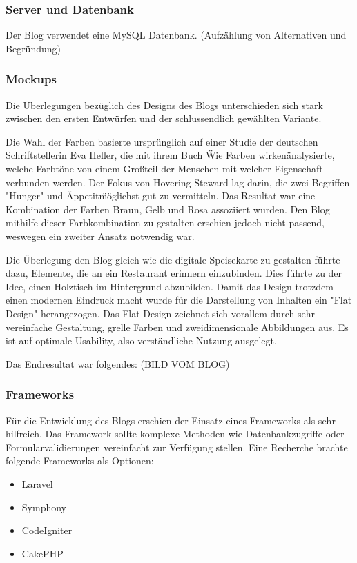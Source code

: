     \subsubsection{Server und Datenbank}
    Der Blog verwendet eine MySQL Datenbank. (Aufzählung von Alternativen und Begründung)
    \subsubsection{Mockups}
    Die Überlegungen bezüglich des Designs des Blogs unterschieden sich stark zwischen den ersten
    Entwürfen und der schlussendlich gewählten Variante.

    Die Wahl der Farben basierte ursprünglich auf einer Studie der deutschen Schriftstellerin Eva Heller,
    die mit ihrem Buch \"Wie Farben wirken\" analysierte, welche Farbtöne von einem Großteil der Menschen
    mit welcher Eigenschaft verbunden werden. Der Fokus von Hovering Steward lag darin, die zwei Begriffen {"Hunger"\cite{WieFarbenWirken}}
    und \"Appetit\" möglichst gut zu vermitteln. Das Resultat war eine Kombination der Farben Braun, Gelb und Rosa
    assoziiert wurden. Den Blog mithilfe dieser Farbkombination zu gestalten erschien jedoch nicht passend, weswegen
    ein zweiter Ansatz notwendig war.

    Die Überlegung den Blog gleich wie die digitale Speisekarte zu gestalten führte dazu, Elemente, die an ein Restaurant
    erinnern einzubinden. Dies führte zu der Idee, einen Holztisch im Hintergrund abzubilden.
    Damit das Design trotzdem einen modernen Eindruck macht wurde für die Darstellung von Inhalten ein {"Flat Design"\cite{FlatDesign}}
    herangezogen. Das Flat Design zeichnet sich vorallem durch sehr vereinfache Gestaltung, grelle Farben und zweidimensionale Abbildungen aus.
    Es ist auf optimale Usability, also verständliche Nutzung ausgelegt.

    Das Endresultat war folgendes:
    (BILD VOM BLOG)
    \subsubsection{Frameworks}
    Für die Entwicklung des Blogs erschien der Einsatz eines Frameworks als sehr hilfreich. Das Framework sollte komplexe Methoden wie
    Datenbankzugriffe oder Formularvalidierungen vereinfacht zur Verfügung stellen. Eine Recherche brachte folgende Frameworks als
    Optionen:
    \begin{itemize}
      \item Laravel
      \item Symphony
      \item CodeIgniter
      \item CakePHP
    \end{itemize}

